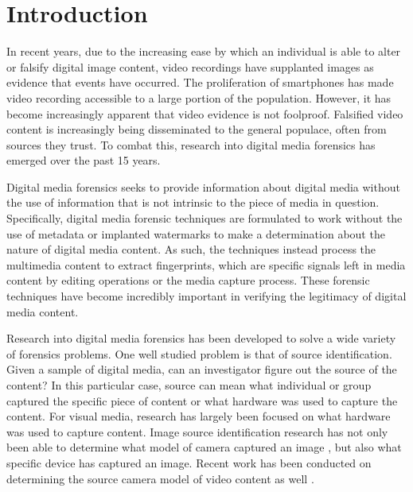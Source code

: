 \chapter{Introduction}

In recent years, due to the increasing ease by which an individual is able to alter or falsify digital image content, video recordings have supplanted images as evidence that events have occurred. The proliferation of smartphones has made video recording accessible to a large portion of the population. However, it has become increasingly apparent that video evidence is not foolproof. Falsified video content is increasingly being disseminated to the general populace, often from sources they trust. To combat this, research into digital media forensics has emerged over the past 15 years.

Digital media forensics seeks to provide information about digital media without the use of information that is not intrinsic to the piece of media in question. Specifically, digital media forensic techniques are formulated to work without the use of metadata or implanted watermarks to make a determination about the nature of digital media content. As such, the techniques instead process the multimedia content to extract fingerprints, which are specific signals left in media content by editing operations or the media capture process. These forensic techniques have become incredibly important in verifying the legitimacy of digital media content.

Research into digital media forensics has been developed to solve a wide variety of forensics problems. One well studied problem is that of source identification. Given a sample of digital media, can an investigator figure out the source of the content? In this particular case, source can mean what individual or group captured the specific piece of content or what hardware was used to capture the content. For visual media, research has largely been focused on what hardware was used to capture content. Image source identification research has not only been able to determine what model of camera captured an image \cite{imagesourceid}, but also what specific device \cite{prnu} has captured an image. Recent work has been conducted on determining the source camera model of video content as well \cite{videosourceid}.

